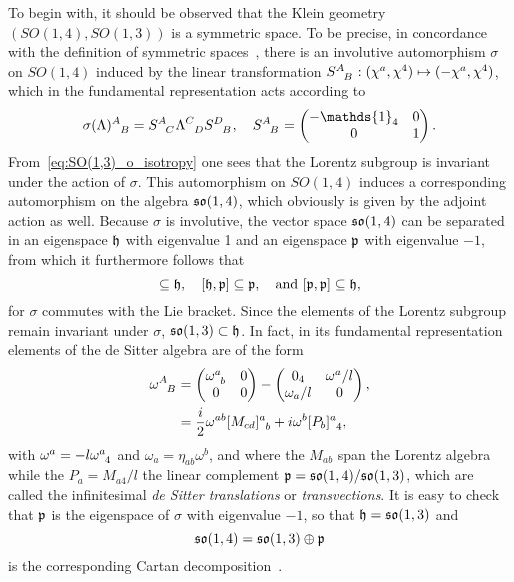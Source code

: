 \documentclass[
final,
11pt,
a4paper,
DIV=11,
headinclude=true,
footinclude=false,
bibliography=totoc,
twoside=true,  %
BCOR=5mm
]{scrbook}
\begin{document}
To begin with, it should be observed that the Klein geometry 
$(SO(1,4),SO(1,3))$ is a symmetric space. To be precise, in 
concordance with the definition of symmetric 
spaces~\cite{kob1996found2, loos:1969ss}, there is an involutive 
automorphism $\sigma$ on $SO(1,4)$ induced by the linear 
transformation $S\ind{^A_B} : (\chi^a,\chi^4) \mapsto 
(-\chi^a,\chi^4)$, which in the fundamental representation acts 
according to
\begin{equation*}
  \sigma(\Lambda)\ind{^A_B} = S\ind{^A_C} \Lambda\ind{^C_D} 
  S\ind{^D_B},
  \quad
  S\ind{^A_B} =
  \begin{pmatrix}
    -\mathds{1}_{4} & 0 \\
    0         & 1
  \end{pmatrix}.
\end{equation*}
From~\eqref{eq:SO(1,3)_o_isotropy} one sees that the Lorentz 
subgroup is invariant under the action of $\sigma$. This 
automorphism on $SO(1,4)$ induces a corresponding automorphism on 
the algebra $\mathfrak{so}(1,4)$, which obviously is given by the 
adjoint action as well. Because $\sigma$ is involutive, the 
vector space $\mathfrak{so}(1,4)$ can be separated in an eigenspace 
$\mathfrak{h}$ with eigenvalue 1 and an eigenspace $\mathfrak{p}$ with 
eigenvalue $-1$, from which it furthermore follows that
\begin{equation*}
  [\mf{h},\mf{h}] \subseteq \mf{h},
  \quad
  [\mf{h},\mf{p}] \subseteq \mf{p},
  \quad\text{and~}
  [\mf{p},\mf{p}] \subseteq \mf{h},
\end{equation*}
for $\sigma$ commutes with the Lie bracket. Since the elements of 
the Lorentz subgroup remain invariant under $\sigma$, 
$\mathfrak{so}(1,3) \subset \mathfrak{h}$. In fact, in its fundamental 
representation elements of the de Sitter algebra are of the form
\begin{align}
\notag
  \omega\ind{^A_B} &=
  \begin{pmatrix}
    \omega\ind{^a_b}  & 0 \\
    0           & 0
  \end{pmatrix}
  -
  \begin{pmatrix}
    0_4           & \omega^a/l \\
    \omega_a/l    & 0
  \end{pmatrix},
  \\
\label{eq:red_split_SO14_fund}
  &= \frac{i}{2} \omega^{ab} [M_{cd}]\ind{^a_b} + i \omega^b 
  [P_b]\ind{^a_4},
\end{align}
with $\omega^a = -l\omega\ind{^a_4}$ and $\omega_a = \eta_{ab} 
\omega^b$, and where the $M_{ab}$ span the Lorentz algebra while 
the $P_a = M_{a4}/l$ the linear complement $\mathfrak{p} 
=\mathfrak{so}(1,4)/\mathfrak{so}(1,3)$, which are called the infinitesimal 
\emph{de Sitter translations} or \emph{transvections}. It is easy 
to check that $\mathfrak{p}$ is the eigenspace of $\sigma$ with 
eigenvalue $-1$, so that $\mathfrak{h} = \mathfrak{so}(1,3)$ and
\begin{equation}
\label{eq:red_split_so14}
  \mathfrak{so}(1,4) = \mathfrak{so}(1,3) \oplus \mathfrak{p}
\end{equation}
is the corresponding Cartan decomposition~\cite{kob1996found2}. 
\end{document}
